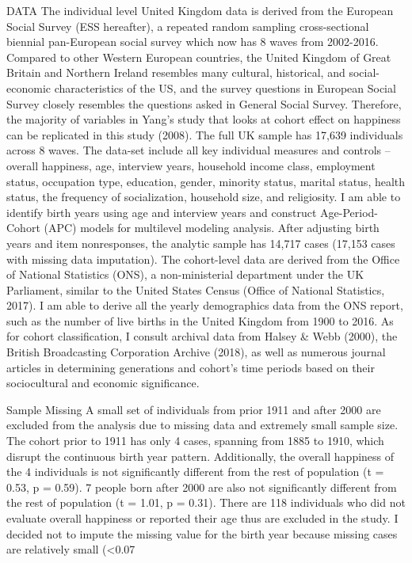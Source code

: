 DATA
The individual level United Kingdom data is derived from the European Social Survey (ESS hereafter), a repeated random sampling cross-sectional biennial pan-European social survey which now has 8 waves from 2002-2016. Compared to other Western European countries, the United Kingdom of Great Britain and Northern Ireland resembles many cultural, historical, and social-economic characteristics of the US, and the survey questions in European Social Survey closely resembles the questions asked in General Social Survey. Therefore, the majority of variables in Yang’s study that looks at cohort effect on happiness can be replicated in this study (2008). The full UK sample has 17,639 individuals across 8 waves. The data-set include all key individual measures and controls – overall happiness, age, interview years, household income class, employment status, occupation type, education, gender, minority status, marital status, health status, the frequency of socialization, household size, and religiosity. I am able to identify birth years using age and interview years and construct Age-Period-Cohort (APC) models for multilevel modeling analysis. After adjusting birth years and item nonresponses, the analytic sample has 14,717 cases (17,153 cases with missing data imputation).
The cohort-level data are derived from the Office of National Statistics (ONS), a non-ministerial department under the UK Parliament, similar to the United States Census (Office of National Statistics, 2017). I am able to derive all the yearly demographics data from the ONS report, such as the number of live births in the United Kingdom from 1900 to 2016. As for cohort classification, I consult archival data from Halsey & Webb (2000), the British Broadcasting Corporation Archive (2018), as well as numerous journal articles in determining generations and cohort’s time periods based on their sociocultural and economic significance.

Sample Missing
A small set of individuals from prior 1911 and after 2000 are excluded from the analysis due to missing data and extremely small sample size. The cohort prior to 1911 has only 4 cases, spanning from 1885 to 1910, which disrupt the continuous birth year pattern. Additionally, the overall happiness of the 4 individuals is not significantly different from the rest of population (t = 0.53, p = 0.59). 7 people born after 2000 are also not significantly different from the rest of population (t = 1.01, p = 0.31). There are 118 individuals who did not evaluate overall happiness or reported their age thus are excluded in the study. I decided not to impute the missing value for the birth year because missing cases are relatively small (<0.07%

